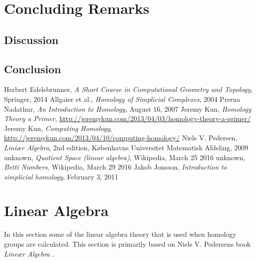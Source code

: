 \documentclass[11pt,a4paper,twoside]{report}
\begin{document}
\chapter{Concluding Remarks}

\section{Discussion}

\section{Conclusion}

\begin{thebibliography}{9}
Herbert Edelsbrunner, \emph{A Short Course in Computational Geometry and Topology}, Springer, 2014
 Allgaier et al., \emph{Homology of Simplicial Complexes}, 2004
 Prerna Nadathur, \emph{An Introduction to Homology}, August 16, 2007
 Jeremy Kun, \emph{Homology Theory a Primer}, \url{http://jeremykun.com/2013/04/03/homology-theory-a-primer/}
 Jeremy Kun, \emph{Computing Homology}, \url{http://jeremykun.com/2013/04/10/computing-homology/}
 Niels V. Pedersen, \emph{Liniær Algebra}, 2nd edition, Københavns Universitet Matematisk Afdeling, 2009
 unknown, \emph{Quotient Space (linear algebra)}, Wikipedia, March 25 2016
 unknown, \emph{Betti Numbers}, Wikipedia, March 29 2016
 Jakob Jonsson, \emph{Introduction to simplicial homology}, February 3, 2011
\end{thebibliography}

\appendix
\chapter{Linear Algebra}\label{ch:linalg}
In this section some of the linear algebra theory that is used when homology groups are calculated. This section is primarily based on Niels V. Pedersens book \emph{Lineær Algebra} \cite{LinAlg}.
\end{document}
